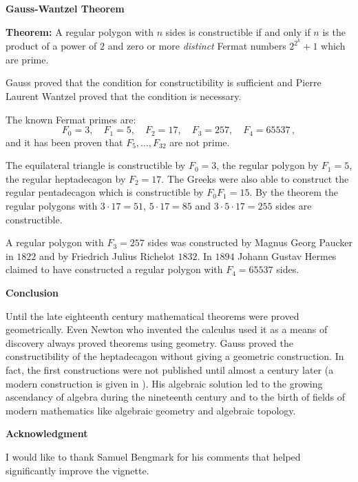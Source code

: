 \documentclass[a4paper,11pt]{article}
\begin{document}
\textbf{Gauss-Wantzel Theorem}

\textbf{Theorem:} A regular polygon with $n$ sides is constructible if and only if $n$ is the product of a power of $2$ and zero or more \emph{distinct} Fermat numbers $2^{2^k}+1$ which are prime.

Gauss proved that the condition for constructibility is sufficient and Pierre Laurent Wantzel proved that the condition is necessary.

The known Fermat primes are:
\[
F_0=3,\quad F_1=5,\quad F_2=17,\quad F_3=257,\quad F_4=65537\,,
\]
and it has been proven that $F_5,\ldots,F_{32}$ are not prime.

The equilateral triangle is constructible by $F_0=3$, the regular polygon by $F_1=5$, the regular heptadecagon by $F_2=17$. The Greeks were also able to construct the regular pentadecagon 
which is constructible by $F_0F_1=15$. By the theorem the regular polygons with $3\cdot 17=51$, $5\cdot 17=85$ and $3\cdot 5\cdot 17 =255$ sides are constructible.

A regular polygon with $F_3=257$ sides was constructed by Magnus Georg Paucker in $1822$ and by Friedrich Julius Richelot $1832$. In $1894$ Johann Gustav Hermes claimed to have constructed a regular polygon  with $F_4=65537$ sides.

\textbf{Conclusion}

Until the late eighteenth century mathematical theorems were proved geometrically. Even Newton who invented the calculus used it as a means of discovery always proved theorems using geometry. Gauss proved the constructibility of the heptadecagon without giving a geometric construction. In fact, the first constructions were not published until almost a century later (a modern construction is given in \cite{callagy}). His algebraic solution led to the growing ascendancy of algebra during the nineteenth century and to the birth of fields of modern mathematics like algebraic geometry and algebraic topology.

\textbf{Acknowledgment}

I would like to thank Samuel Bengmark for his comments that helped significantly improve the vignette.

\nocite{*}


\end{document}
